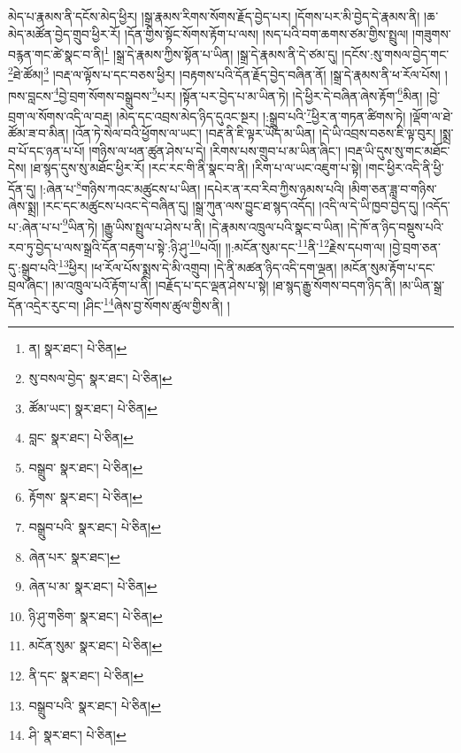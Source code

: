 མེད་པ་རྣམས་ནི་དངོས་མེད་ཕྱིར། །སྒྲ་རྣམས་རིགས་སོགས་རྗོད་བྱེད་པར། །དོགས་པར་མི་བྱེད་དེ་རྣམས་ནི། །ཆ་མེད་མཚོན་བྱེད་གྲུབ་ཕྱིར་རོ། །དོན་གྱིས་སྟོང་སོགས་རྟོག་པ་ལས། །སད་པའི་བག་ཆགས་ཙམ་གྱིས་སྤྲུལ། །གཟུགས་བརྙན་གང་ཚེ་སྣང་བ་ནི།\footnote{ན།  སྣར་ཐང་།  པེ་ཅིན། } །སྒྲ་དེ་རྣམས་ཀྱིས་སྟོན་པ་ཡིན། །སྒྲ་དེ་རྣམས་ནི་དེ་ཙམ་དུ། །དངོས་:སུ་གསལ་བྱེད་གང་\footnote{སུ་བསལ་བྱེད་  སྣར་ཐང་།  པེ་ཅིན། }ཐེ་ཚོམ།\footnote{ཚོམ་ཡང་།  སྣར་ཐང་།  པེ་ཅིན། } །བརྡ་ལ་ལྟོས་པ་དང་བཅས་ཕྱིར། །བརྟགས་པའི་དོན་རྗོད་བྱེད་བཞིན་ནོ། །སྒྲ་དེ་རྣམས་ནི་ཕ་རོལ་པོས། །ཁས་བླངས་\footnote{བླང་  སྣར་ཐང་།  པེ་ཅིན། }བྱེ་བྲག་སོགས་བསྒྲུབས་\footnote{བསྒྲུབ་  སྣར་ཐང་།  པེ་ཅིན། }པར། །སྟོན་པར་བྱེད་པ་མ་ཡིན་ཏེ། །དེ་ཕྱིར་དེ་བཞིན་ཞེས་རྟོག་\footnote{རྟོགས་  སྣར་ཐང་།  པེ་ཅིན། }མིན། །བྱེ་བྲག་ལ་སོགས་འདི་ལ་བརྡ། །མེད་དང་འབྲས་མེད་ཉིད་དུའང་སྔར། །:སྒྲུབ་པའི་\footnote{བསྒྲུབ་པའི་  སྣར་ཐང་།  པེ་ཅིན། }ཕྱིར་ན་གཏན་ཚིགས་ཏེ། །ལྡོག་ལ་ཐེ་ཚོམ་ཟ་བ་མིན། །འོན་ཏེ་སེལ་བའི་ཕྱོགས་ལ་ཡང་། །བརྡ་ནི་ཇི་ལྟར་ཡོད་མ་ཡིན། །དེ་ཡི་འབྲས་བཅས་ཇི་ལྟ་བུར། །སྨྲ་བ་པོ་དང་ཉན་པ་པོ། །གཉིས་ལ་ཕན་ཚུན་ཤེས་པ་དེ། །རིགས་པས་གྲུབ་པ་མ་ཡིན་ཞིང་། །བརྡ་ཡི་དུས་སུ་གང་མཐོང་དེས། །ཐ་སྙད་དུས་སུ་མཐོང་ཕྱིར་རོ། །རང་རང་གི་ནི་སྣང་བ་ནི། །རིག་པ་ལ་ཡང་འཇུག་པ་སྟེ། །གང་ཕྱིར་འདི་ནི་ཕྱི་དོན་དུ། །:ཞེན་པ་\footnote{ཞེན་པར་  སྣར་ཐང་། }གཉིས་ཀའང་མཚུངས་པ་ཡིན། །དཔེར་ན་རབ་རིབ་ཀྱིས་ཉམས་པའི། །མིག་ཅན་ཟླ་བ་གཉིས་ཞེས་སྨྲ། །རང་དང་མཚུངས་པའང་དེ་བཞིན་དུ། །སྒྲ་ཀུན་ལས་བྱུང་ཐ་སྙད་འདོད། །འདི་ལ་དེ་ཡི་ཁྱབ་བྱེད་དུ། །འདོད་པ་:ཞེན་པ་པ་\footnote{ཞེན་པ་མ་  སྣར་ཐང་།  པེ་ཅིན། }ཡིན་ཏེ། །རྒྱུ་ཡིས་སྤྲུལ་པ་ཤེས་པ་ནི། །དེ་རྣམས་འཁྲུལ་པའི་སྣང་བ་ཡིན། །དེ་ཁོ་ན་ཉིད་བསྡུས་པའི་རབ་ཏུ་བྱེད་པ་ལས་སྒྲའི་དོན་བརྟག་པ་སྟེ་:ཉི་ཤུ་\footnote{ཉི་ཤུ་གཅིག་  སྣར་ཐང་།  པེ་ཅིན། }པའོ།། །།:མངོན་སུམ་དང་\footnote{མངོན་སུམ་  སྣར་ཐང་།  པེ་ཅིན། }ནི་\footnote{ནི་དང་  སྣར་ཐང་།  པེ་ཅིན། }རྗེས་དཔག་ལ། །བྱེ་བྲག་ཅན་དུ་:སྒྲུབ་པའི་\footnote{བསྒྲུབ་པའི་  སྣར་ཐང་།  པེ་ཅིན། }ཕྱིར། །ཕ་རོལ་པོས་སྨྲས་དེ་མི་འགྲུབ། །དེ་ནི་མཚན་ཉིད་འདི་དག་ལྡན། །མངོན་སུམ་རྟོག་པ་དང་བྲལ་ཞིང་། །མ་འཁྲུལ་པའོ་རྟོག་པ་ནི། །བརྗོད་པ་དང་ལྡན་ཤེས་པ་སྟེ། །ཐ་སྙད་རྒྱུ་སོགས་བདག་ཉིད་ནི། །མ་ཡིན་སྒྲ་དོན་འདྲེར་རུང་བ། །ཤིང་\footnote{ཤི་  སྣར་ཐང་།  པེ་ཅིན། }ཞེས་བྱ་སོགས་ཚུལ་གྱིས་ནི། །
